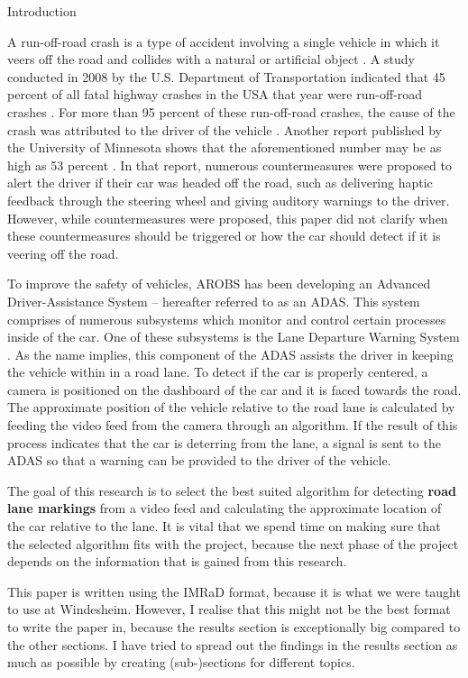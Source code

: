 \documentclass{matthijs}
\begin{document}
	\begin{hoofdstuk}{Introduction}

		A run-off-road crash is a type of accident involving a single vehicle in which it veers off the road and collides with a natural or artificial object \cite{liu2009factors}.
		A study conducted in 2008 by the U.S. Department of Transportation indicated that 45 percent of all fatal highway crashes in the USA that year were run-off-road crashes \cite{dod2011run}.
		For more than 95 percent of these run-off-road crashes, the cause of the crash was attributed to the driver of the vehicle \cite{dod2011run}.
		Another report published by the University of Minnesota shows that the aforementioned number may be as high as 53 percent \cite{edwards2013pilot}.
		In that report, numerous countermeasures were proposed to alert the driver if their car was headed off the road, such as delivering haptic feedback through the steering wheel and giving auditory warnings to the driver.
		However, while countermeasures were proposed, this paper did not clarify when these countermeasures should be triggered or how the car should detect if it is veering off the road.
		
		\bigskip

		To improve the safety of vehicles, AROBS has been developing an Advanced Driver-Assistance System -- hereafter referred to as an ADAS.
		This system comprises of numerous subsystems which monitor and control certain processes inside of the car.
		One of these subsystems is the Lane Departure Warning System \cite{el2020novel}.
		As the name implies, this component of the ADAS assists the driver in keeping the vehicle within in a road lane.
		To detect if the car is properly centered, a camera is positioned on the dashboard of the car and it is faced towards the road.
		The approximate position of the vehicle relative to the road lane is calculated by feeding the video feed from the camera through an algorithm.
		If the result of this process indicates that the car is deterring from the lane, a signal is sent to the ADAS so that a warning can be provided to the driver of the vehicle.
		
		\bigskip

		The goal of this research is to select the best suited algorithm for detecting \textbf{road lane markings} from a video feed and calculating the approximate location of the car relative to the lane.
		It is vital that we spend time on making sure that the selected algorithm fits with the project, because the next phase of the project depends on the information that is gained from this research.

		\bigskip

		This paper is written using the IMRaD format, because it is what we were taught to use at Windesheim.
		However, I realise that this might not be the best format to write the paper in, because the results section is exceptionally big compared to the other sections.
		I have tried to spread out the findings in the results section as much as possible by creating (sub-)sections for different topics.

	\end{hoofdstuk}
\end{document}
